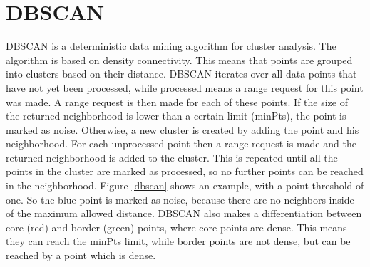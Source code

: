 \section{\acl{DBSCAN}}

\ac{DBSCAN} \cite{DBSCAN} is a deterministic data mining algorithm for cluster analysis. The algorithm is based on density connectivity.
This means that points are grouped into clusters based on their distance.
\ac {DBSCAN} iterates over all data points that have not yet been processed, while processed means a range request for this point was made.
A range request is then made for each of these points. If the size of the returned neighborhood is lower than a certain limit (minPts), the point is marked as noise.
Otherwise, a new cluster is created by adding the point and his neighborhood.
For each unprocessed point then a range request is made and the returned neighborhood is added to the cluster.
This is repeated until all the points in the cluster are marked as processed, so no further points can be reached in the neighborhood.
Figure \ref{dbscan} shows an example, with a point threshold of one. So the blue point is marked as noise, because there are no neighbors inside of the maximum allowed distance.
\ac{DBSCAN} also makes a differentiation between core (red) and border (green) points, where core points are dense. This means they can reach the minPts limit, while border points are not dense, but can be reached by a point which is dense.

